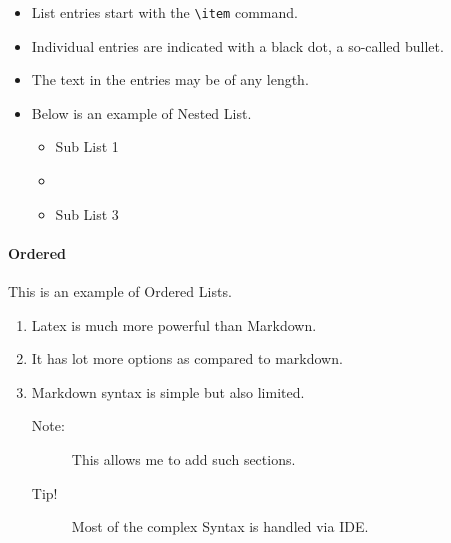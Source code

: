 \documentclass{article}[a4paper,12pt]
\begin{document}
\begin{itemize}
  \label{lst:bullet}
  \item List entries start with the \verb|\item| command.
  \item Individual entries are indicated with a black dot, a so-called bullet.
  \item The text in the entries may be of any length.
  \item Below is an example of Nested List.
  \begin{itemize}
    \item Sub List 1
    \item \lipsum[1]
    \item Sub List 3
  \end{itemize}
\end{itemize}

\paragraph{Ordered}
This is an example of Ordered Lists.

\begin{enumerate}
  \label{lst:order}
  \item Latex is much more powerful than Markdown.
  \item It has lot more options as compared to markdown.
  \item Markdown syntax is simple but also limited.
  \begin{description}
    \item[Note:] This allows me to add such sections.
    \item[Tip!] Most of the complex Syntax is handled via IDE.
  \end{description}
\end{enumerate}

\begin{appendix}
  \listoffigures
  \listoftables
\end{appendix}
\end{document}
